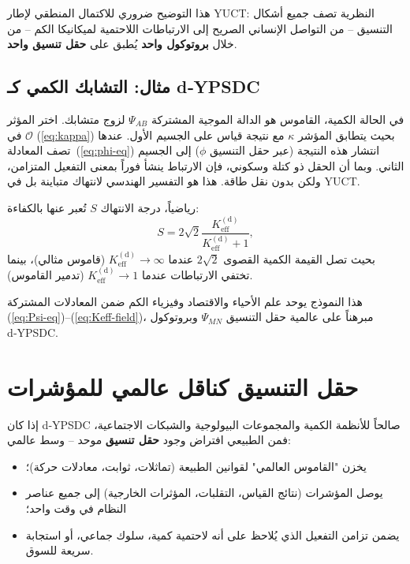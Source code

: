 \documentclass[11pt,a4paper]{article}
\newcommand{\Keff}{K_{\mathrm{eff}}}
\begin{document}
	هذا التوضيح ضروري للاكتمال المنطقي لإطار YUCT: النظرية تصف جميع أشكال التنسيق – من التواصل الإنساني الصريح إلى الارتباطات اللاحتمية لميكانيكا الكم – من خلال \textbf{بروتوكول واحد} يُطبق على \textbf{حقل تنسيق واحد}.
	
	\subsection{مثال: التشابك الكمي كـ d‑YPSDC}
	
	في الحالة الكمية، القاموس هو الدالة الموجية المشتركة \(\Psi_{AB}\) لزوج متشابك. اختر المؤثر \(\mathcal{O}\) في (\ref{eq:kappa}) بحيث يتطابق المؤشر \(\kappa\) مع نتيجة قياس على الجسيم الأول. عندها تصف المعادلة~(\ref{eq:phi-eq}) انتشار هذه النتيجة (عبر حقل التنسيق \(\phi\)) إلى الجسيم الثاني. وبما أن الحقل ذو كتلة وسكوني، فإن الارتباط ينشأ فوراً بمعنى التفعيل المتزامن، ولكن بدون نقل طاقة. هذا هو التفسير الهندسي لانتهاك متباينة بل في YUCT.
	
	رياضياً، درجة الانتهاك \(S\) تُعبر عنها بالكفاءة:
	\begin{equation}
		S = 2\sqrt{2} \frac{\Keff^{\mathrm{(d)}}}{\Keff^{\mathrm{(d)}} + 1},
	\end{equation}
	بحيث تصل القيمة الكمية القصوى \(2\sqrt{2}\) عندما \(\Keff^{\mathrm{(d)}} \to \infty\) (قاموس مثالي)، بينما تختفي الارتباطات عندما \(\Keff^{\mathrm{(d)}} \to 1\) (تدمير القاموس).
	
	هذا النموذج يوحد علم الأحياء والاقتصاد وفيزياء الكم ضمن المعادلات المشتركة (\ref{eq:Psi-eq})–(\ref{eq:Keff-field})، مبرهناً على عالمية حقل التنسيق \(\Psi_{MN}\) وبروتوكول d‑YPSDC.
	
	\section{حقل التنسيق كناقل عالمي للمؤشرات}
	
	إذا كان d‑YPSDC صالحاً للأنظمة الكمية والمجموعات البيولوجية والشبكات الاجتماعية، فمن الطبيعي افتراض وجود \textbf{حقل تنسيق} موحد – وسط عالمي:
	
	\begin{itemize}
		\item يخزن "القاموس العالمي" لقوانين الطبيعة (تماثلات، ثوابت، معادلات حركة)؛
		\item يوصل المؤشرات (نتائج القياس، التقلبات، المؤثرات الخارجية) إلى جميع عناصر النظام في وقت واحد؛
		\item يضمن تزامن التفعيل الذي يُلاحظ على أنه لاحتمية كمية، سلوك جماعي، أو استجابة سريعة للسوق.
	\end{itemize}
	
\end{document}

